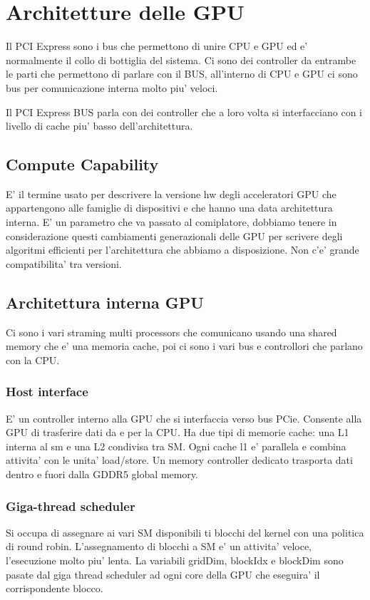\section{Architetture delle GPU}
Il PCI Express sono i bus che permettono di unire CPU e GPU ed e' normalmente il collo di bottiglia del sistema. Ci sono dei controller da entrambe le parti che permettono di parlare con il BUS, all'interno di CPU e GPU ci sono bus per comunicazione interna molto piu' veloci.

Il PCI Express BUS parla con dei controller che a loro volta si interfacciano con i livello di cache piu' basso dell'architettura.

\subsection{Compute Capability}
E' il termine usato per descrivere la versione hw degli acceleratori GPU che appartengono alle famiglie di dispositivi e che hanno una data architettura interna. E' un parametro che va passato al comiplatore, dobbiamo tenere in considerazione questi cambiamenti generazionali delle GPU per scrivere degli algoritmi efficienti per l'architettura che abbiamo a disposizione.
Non c'e' grande compatibilita' tra versioni.

\subsection{Architettura interna GPU}
Ci sono i vari straming multi processors che comunicano usando una shared memory che e' una memoria cache, poi ci sono i vari bus e controllori che parlano con la CPU.

\subsubsection{Host interface}
E' un controller interno alla GPU che si interfaccia verso bus PCie. Consente alla GPU di trasferire dati da e per la CPU. Ha due tipi di memorie cache: una L1 interna al sm e una L2 condivisa tra SM. Ogni cache l1 e' parallela e combina attivita' con le unita' load/store. Un memory controller dedicato trasporta dati dentro e fuori dalla GDDR5 global memory.

\subsubsection{Giga-thread scheduler}
Si occupa di assegnare ai vari SM disponibili ti blocchi del kernel con una politica di round robin. 
L'assegnamento di blocchi a SM e' un attivita' veloce, l'esecuzione molto piu' lenta.
La variabili gridDim, blockIdx e blockDim sono pasate dal giga thread scheduler ad ogni core della GPU che eseguira' il corrispondente blocco.


